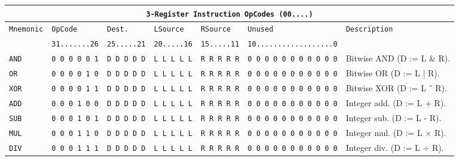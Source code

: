 \documentclass{report}
\begin{document}
{\footnotesize
\begin{center}
\begin{tabular}[ht]{
	| p{} | p{} | p{} | p{}
	| p{} | p{} | p{} |
}
	\hline
	\multicolumn{7}{|c|}{\texttt{3-Register Instruction OpCodes (00....)}} \\
	\hline \hline
	
	\multirow{2}{*}{\texttt{Mnemonic}} & \texttt{OpCode} & \texttt{Dest.} & \texttt{LSource} & \texttt{RSource} &
		\texttt{Unused} & \multirow{2}{*}{\texttt{Description}} \\
	& \texttt{31.......26} & \texttt{25.....21} & \texttt{20.....16} & \texttt{15.....11} &
		\texttt{10..................0} & \\
	\hline
	
	\texttt{AND} & \texttt{0 0 0 0 0 1} & \texttt{D D D D D} & \texttt{L L L L L} & \texttt{R R R R R} &
		\texttt{0 0 0 0 0 0 0 0 0 0 0} & Bitwise AND (D := L \& R). \\
	\hline
	
	\texttt{OR} & \texttt{0 0 0 0 1 0} & \texttt{D D D D D} & \texttt{L L L L L} & \texttt{R R R R R} &
		\texttt{0 0 0 0 0 0 0 0 0 0 0} & Bitwise OR (D := L | R). \\
	\hline
	
	\texttt{XOR} & \texttt{0 0 0 0 1 1} & \texttt{D D D D D} & \texttt{L L L L L} & \texttt{R R R R R} &
		\texttt{0 0 0 0 0 0 0 0 0 0 0} & Bitwise XOR (D := L ${\mathchar"5E}$ R). \\
	\hline
	
	\texttt{ADD} & \texttt{0 0 0 1 0 0} & \texttt{D D D D D} & \texttt{L L L L L} & \texttt{R R R R R} &
		\texttt{0 0 0 0 0 0 0 0 0 0 0} & Integer add. (D := L + R). \\
	\hline
	
	\texttt{SUB} & \texttt{0 0 0 1 0 1} & \texttt{D D D D D} & \texttt{L L L L L} & \texttt{R R R R R} &
		\texttt{0 0 0 0 0 0 0 0 0 0 0} & Integer sub. (D := L - R). \\
	\hline
	
	\texttt{MUL} & \texttt{0 0 0 1 1 0} & \texttt{D D D D D} & \texttt{L L L L L} & \texttt{R R R R R} &
		\texttt{0 0 0 0 0 0 0 0 0 0 0} & Integer mul. (D := L $\times$ R). \\
	\hline
	
	\texttt{DIV} & \texttt{0 0 0 1 1 1} & \texttt{D D D D D} & \texttt{L L L L L} & \texttt{R R R R R} &
		\texttt{0 0 0 0 0 0 0 0 0 0 0} & Integer div. (D := L $\div$ R). \\
	\hline
	

\end{tabular}
\end{center}}
\end{document}
